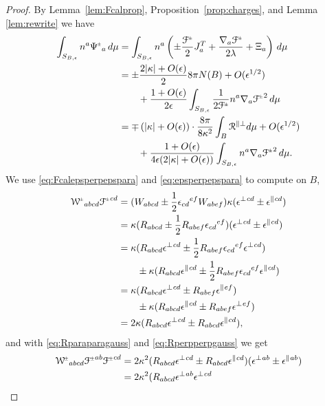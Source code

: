 \documentclass[a4paper,10pt,reqno]{amsart}
\newcommand{\bolt}{B}
\newcommand{\cR}{\mathcal{R}}
\theoremstyle{plain}
\newcommand{\PM}[1]{{{#1}^{\hspace{-.5pt}\scaleto{\pm}{3.5pt}}}}
\def\Wcal{\mathcal{W}}
\def\Fcal{\mathcal{F}}
\numberwithin{equation}{section}
\newcommand{\eps}{\epsilon}
\begin{document}
\begin{proof} 
By Lemma~\ref{lem:Fcalprop}, Proposition~\ref{prop:charges}, and Lemma \ref{lem:rewrite} we have 
%
\begin{align}
\int_{S_{\bolt,\epsilon}} n^a \PM{\Psi}_a \, d\mu
&=
\int_{S_{\bolt,\epsilon}} n^a  
\left(
\pm\frac{\PM{\Fcal}}{2} J^T_a
+ \frac{\nabla_a \PM{\Fcal}}{2\lambda}
 + \Xi_a \right) \, d\mu \\
&=
\pm\frac{2|\kappa| + O(\epsilon)}{2} 8\pi N(\bolt)
+ O(\epsilon^{1/2})
\\
&\qquad
+\frac{1 + O(\epsilon)}{2\epsilon} \int_{S_{\bolt,\epsilon}}
\frac{1}{2\PM{\Fcal}} n^a \nabla_a \PM{\Fcal}^2 \, d\mu
\\
&=
\mp \left( |\kappa| + O(\epsilon) \right)
\cdot \frac{8\pi}{8\kappa^2} \int_\bolt  \cR^{\parallel\perp} d\mu
+ O(\epsilon^{1/2})
\\
&\qquad
+\frac{1 + O(\epsilon)}{4\epsilon (2|\kappa| + O(\epsilon) )} 
\int_{S_{\bolt,\epsilon}} n^a \nabla_a \PM{\Fcal}^2 \, d\mu.
\end{align}
We use \eqref{eq:Fcalepsperpepspara} and \eqref{eq:epsperpepspara} to compute on $\bolt$,
\begin{align}
\PM{\Wcal}_{abcd} \PM{\Fcal}^{cd}
&=
(W_{abcd} \pm \frac{1}{2} \eps_{cd}{}^{ef} W_{abef})
\kappa (\eps^\perp{}^{cd} \pm \eps^\parallel{}^{cd}) \\
&=
\kappa(R_{abcd} \pm \frac{1}{2} R_{abef} \eps_{cd}{}^{ef} )
(\eps^\perp{}^{cd} \pm \eps^\parallel{}^{cd}) \\
&=
\kappa(R_{abcd}\eps^\perp{}^{cd} \pm \frac{1}{2}R_{abef}\eps_{cd}{}^{ef}\eps^\perp{}^{cd}) \\
&\qquad
\pm
\kappa(R_{abcd}\eps^\parallel{}^{cd} \pm \frac{1}{2}R_{abef} \eps_{cd}{}^{ef}\eps^\parallel{}^{cd} ) \\
&=
\kappa(R_{abcd}\eps^\perp{}^{cd} \pm R_{abef}\eps^\parallel{}^{ef}) \\
&\qquad
\pm
\kappa(R_{abcd}\eps^\parallel{}^{cd} \pm R_{abef} \eps^\perp{}^{ef} ) \\
&=
2\kappa 
( R_{abcd}\eps^\perp{}^{cd} \pm R_{abcd}\eps^\parallel{}^{cd} ) ,
\end{align}
and with \eqref{eq:Rparaparagauss} and \eqref{eq:Rperpperpgauss} we get
\begin{align}
\PM{\Wcal}_{abcd} \PM{\Fcal}^{ab} \PM{\Fcal}^{cd}
&=
2\kappa^2 
( R_{abcd}\eps^\perp{}^{cd} \pm R_{abcd}\eps^\parallel{}^{cd} )
(\eps^\perp{}^{ab} \pm \eps^\parallel{}^{ab}) \\
&= 
2\kappa^2 
( R_{abcd}\eps^\perp{}^{ab} \eps^\perp{}^{cd} 

\end{align}
\end{proof}
\end{document}
